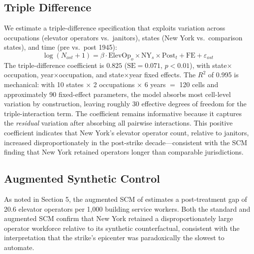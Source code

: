 \documentclass[12pt]{article}
\begin{document}
\subsection{Triple Difference}

We estimate a triple-difference specification that exploits variation across occupations (elevator operators vs.\ janitors), states (New York vs.\ comparison states), and time (pre vs.\ post 1945):
\begin{equation}
    \log(N_{ost} + 1) = \beta \cdot \text{ElevOp}_o \times \text{NY}_s \times \text{Post}_t + \text{FE} + \varepsilon_{ost}
\end{equation}
The triple-difference coefficient is $0.825$ ($\text{SE} = 0.071$, $p < 0.01$), with state$\times$occupation, year$\times$occupation, and state$\times$year fixed effects. The $R^2$ of 0.995 is mechanical: with 10 states $\times$ 2 occupations $\times$ 6 years $=$ 120 cells and approximately 90 fixed-effect parameters, the model absorbs most cell-level variation by construction, leaving roughly 30 effective degrees of freedom for the triple-interaction term. The coefficient remains informative because it captures the \textit{residual} variation after absorbing all pairwise interactions. This positive coefficient indicates that New York's elevator operator count, relative to janitors, increased disproportionately in the post-strike decade---consistent with the SCM finding that New York retained operators longer than comparable jurisdictions.

\subsection{Augmented Synthetic Control}

As noted in Section 5, the augmented SCM of \citet{benmichael2021} estimates a post-treatment gap of 20.6 elevator operators per 1,000 building service workers. Both the standard and augmented SCM confirm that New York retained a disproportionately large operator workforce relative to its synthetic counterfactual, consistent with the interpretation that the strike's epicenter was paradoxically the slowest to automate.
\end{document}
